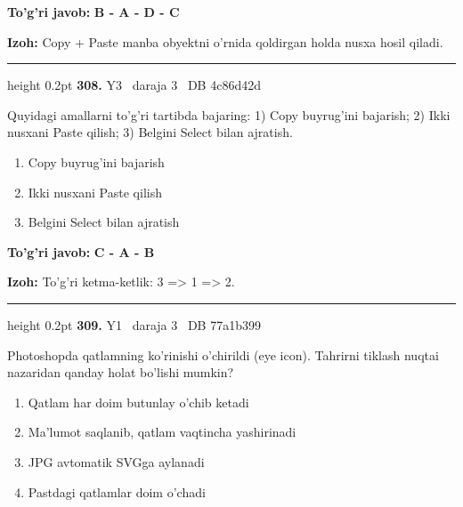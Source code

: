 \documentclass[10pt,a4paper,oneside]{article}
\begin{document}
\begin{tcolorbox}[enhanced,breakable,colback=teal!4,colframe=teal!45!black,boxrule=0.45pt,arc=1.2mm,left=2.8mm,right=2.8mm,top=2mm,bottom=2mm,before skip=2mm,after skip=2mm]
\textbf{\color{teal}To'g'ri javob:} \textbf{B - A - D - C}
\par\smallskip
\textbf{Izoh:} Copy + Paste manba obyektni o'rnida qoldirgan holda nusxa hosil qiladi.
\end{tcolorbox}
\vspace{2mm}\hrule height 0.2pt \vspace{4mm}
\hypertarget{q308}{\textbf{\color{ink}308.}}  {\color{muted}\scriptsize Y3 \textbullet\ daraja 3 \textbullet\ DB 4c86d42d}
\par
Quyidagi amallarni to'g'ri tartibda bajaring: 1) Copy buyrug'ini bajarish; 2) Ikki nusxani Paste qilish; 3) Belgini Select bilan ajratish.
\begin{enumerate}[label=\Alph*),leftmargin=9mm]
\item Copy buyrug'ini bajarish
\item Ikki nusxani Paste qilish
\item Belgini Select bilan ajratish
\end{enumerate}
\begin{tcolorbox}[enhanced,breakable,colback=teal!4,colframe=teal!45!black,boxrule=0.45pt,arc=1.2mm,left=2.8mm,right=2.8mm,top=2mm,bottom=2mm,before skip=2mm,after skip=2mm]
\textbf{\color{teal}To'g'ri javob:} \textbf{C - A - B}
\par\smallskip
\textbf{Izoh:} To'g'ri ketma-ketlik: 3 =\textgreater{} 1 =\textgreater{} 2.
\end{tcolorbox}
\vspace{2mm}\hrule height 0.2pt \vspace{4mm}
\hypertarget{q309}{\textbf{\color{ink}309.}}  {\color{muted}\scriptsize Y1 \textbullet\ daraja 3 \textbullet\ DB 77a1b399}
\par
Photoshopda qatlamning ko'rinishi o'chirildi (eye icon). Tahrirni tiklash nuqtai nazaridan qanday holat bo'lishi mumkin?
\begin{enumerate}[label=\Alph*),leftmargin=9mm]
\item Qatlam har doim butunlay o'chib ketadi
\item Ma'lumot saqlanib, qatlam vaqtincha yashirinadi
\item JPG avtomatik SVGga aylanadi
\item Pastdagi qatlamlar doim o'chadi
\end{enumerate}
\end{document}
